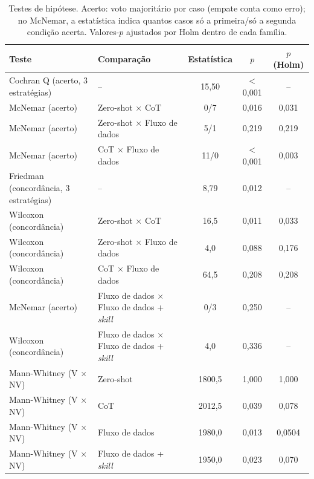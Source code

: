\begin{table}[t]
\caption{Testes de hipótese. Acerto: voto majoritário por caso (empate conta como erro); no McNemar, a estatística indica quantos casos só a primeira/só a segunda condição acerta. Valores-$p$ ajustados por Holm dentro de cada família.}
\label{tab:testes}
\small
\begin{tabular}{llccc}
\toprule
Teste & Comparação & Estatística & $p$ & $p$ (Holm) \\
\midrule
Cochran Q (acerto, 3 estratégias) & -- & 15,50 & $<$0,001 & -- \\
McNemar (acerto) & Zero-shot $\times$ CoT & 0/7 & 0,016 & 0,031 \\
McNemar (acerto) & Zero-shot $\times$ Fluxo de dados & 5/1 & 0,219 & 0,219 \\
McNemar (acerto) & CoT $\times$ Fluxo de dados & 11/0 & $<$0,001 & 0,003 \\
Friedman (concordância, 3 estratégias) & -- & 8,79 & 0,012 & -- \\
Wilcoxon (concordância) & Zero-shot $\times$ CoT & 16,5 & 0,011 & 0,033 \\
Wilcoxon (concordância) & Zero-shot $\times$ Fluxo de dados & 4,0 & 0,088 & 0,176 \\
Wilcoxon (concordância) & CoT $\times$ Fluxo de dados & 64,5 & 0,208 & 0,208 \\
McNemar (acerto) & Fluxo de dados $\times$ Fluxo de dados + \textit{skill} & 0/3 & 0,250 & -- \\
Wilcoxon (concordância) & Fluxo de dados $\times$ Fluxo de dados + \textit{skill} & 4,0 & 0,336 & -- \\
Mann-Whitney (V $\times$ NV) & Zero-shot & 1800,5 & 1,000 & 1,000 \\
Mann-Whitney (V $\times$ NV) & CoT & 2012,5 & 0,039 & 0,078 \\
Mann-Whitney (V $\times$ NV) & Fluxo de dados & 1980,0 & 0,013 & 0,0504 \\
Mann-Whitney (V $\times$ NV) & Fluxo de dados + \textit{skill} & 1950,0 & 0,023 & 0,070 \\
\bottomrule
\end{tabular}
\end{table}


